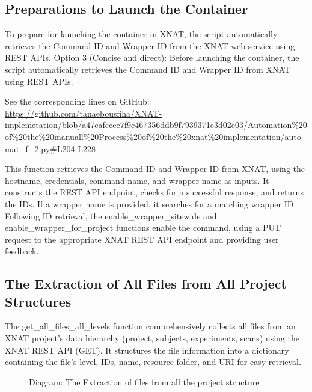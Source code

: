 \subsection{Preparations to Launch the Container}

To prepare for launching the container in XNAT, the script automatically retrieves the Command ID and Wrapper ID from the XNAT web service using REST APIs.
Option 3 (Concise and direct): Before launching the container, the script automatically retrieves the Command ID and Wrapper ID from XNAT using REST APIs.


\noindent\footnotesize See the corresponding lines on GitHub:\url{ https://github.com/tanaebousfiha/XNAT-implemetation/blob/a47cafecee7f9e467356ddb9f7939371e3d02e03/Automation%20of%20the%20manuall%20Process%20of%20the%20xnat%20implementation/automat_f_2.py#L204-L228}



This function retrieves the Command ID and Wrapper ID from XNAT, using the hostname, credentials, command name, and wrapper name as inputs. It constructs the REST API endpoint, checks for a successful response, and returns the IDs. If a wrapper name is provided, it searches for a matching wrapper ID. Following ID retrieval, the enable\_wrapper\_sitewide and enable\_wrapper\_for\_project functions enable the command, using a PUT request to the appropriate XNAT REST API endpoint and providing user feedback.

\subsection{The Extraction of All Files from All Project Structures}

The get\_all\_files\_all\_levels function comprehensively collects all files from an XNAT project's data hierarchy (project, subjects, experiments, scans) using the XNAT REST API (GET). It structures the file information into a dictionary containing the file's level, IDs, name, resource folder, and URI for easy retrieval.

\begin{figure}[ht]
    \centering
    \def\svgwidth{0.9\linewidth}
    
    \caption{Diagram: The Extraction of files from all the project structure}
    \label{fig:enter-label}
\end{figure}

